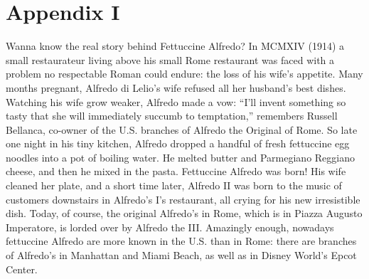 \documentclass[twocolumn,10pt]{article}
\begin{document}
\section*{Appendix I}

\vspace{-2mm}



Wanna know the real story behind Fettuccine Alfredo?
In MCMXIV (1914) a small restaurateur living above his small Rome 
restaurant was
faced with a problem no respectable Roman could endure: the loss of 
his
wife's appetite. Many months pregnant, Alfredo di Lelio's wife 
refused all
her husband's best dishes. Watching his wife grow weaker, Alfredo 
made a
vow: ``I'll invent something so tasty that she will immediately 
succumb to
temptation,'' remembers Russell Bellanca, co-owner of the U.S. 
branches of
Alfredo the Original of Rome. So late one night in his tiny kitchen,
Alfredo dropped a handful of fresh fettuccine egg noodles into a pot 
of
boiling water. He melted butter and Parmegiano Reggiano cheese, and 
then
he mixed in the pasta. Fettuccine Alfredo was born! His wife cleaned 
her
plate, and a short time later, Alfredo II was born to the music of
customers downstairs in Alfredo's I's restaurant, all crying for his 
new
irresistible dish.
Today, of course, the original Alfredo's in Rome, which is in Piazza 
Augusto Imperatore, is lorded over by Alfredo
the III. Amazingly enough, nowadays fettuccine Alfredo are more known 
in the U.S. than in Rome: there are branches of Alfredo's in 
Manhattan and Miami Beach, as
well as in Disney World's Epcot Center. 
\end{document}
